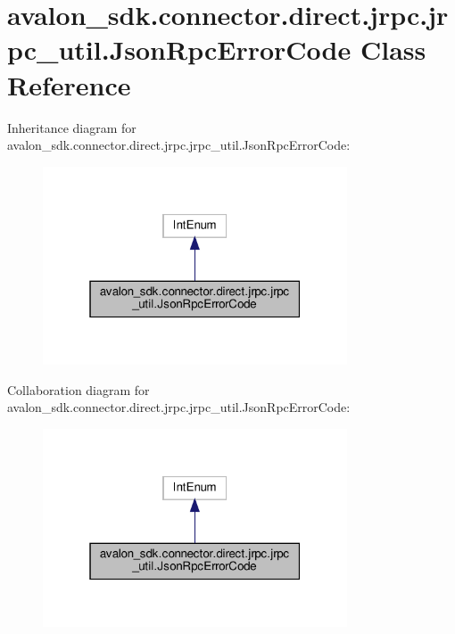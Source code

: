 \hypertarget{classavalon__sdk_1_1connector_1_1direct_1_1jrpc_1_1jrpc__util_1_1JsonRpcErrorCode}{}\section{avalon\+\_\+sdk.\+connector.\+direct.\+jrpc.\+jrpc\+\_\+util.\+Json\+Rpc\+Error\+Code Class Reference}
\label{classavalon__sdk_1_1connector_1_1direct_1_1jrpc_1_1jrpc__util_1_1JsonRpcErrorCode}


Inheritance diagram for avalon\+\_\+sdk.\+connector.\+direct.\+jrpc.\+jrpc\+\_\+util.\+Json\+Rpc\+Error\+Code\+:
\nopagebreak
\begin{figure}[H]
\begin{center}
\leavevmode
\includegraphics[width=256pt]{classavalon__sdk_1_1connector_1_1direct_1_1jrpc_1_1jrpc__util_1_1JsonRpcErrorCode__inherit__graph}
\end{center}
\end{figure}


Collaboration diagram for avalon\+\_\+sdk.\+connector.\+direct.\+jrpc.\+jrpc\+\_\+util.\+Json\+Rpc\+Error\+Code\+:
\nopagebreak
\begin{figure}[H]
\begin{center}
\leavevmode
\includegraphics[width=256pt]{classavalon__sdk_1_1connector_1_1direct_1_1jrpc_1_1jrpc__util_1_1JsonRpcErrorCode__coll__graph}
\end{center}
\end{figure}
